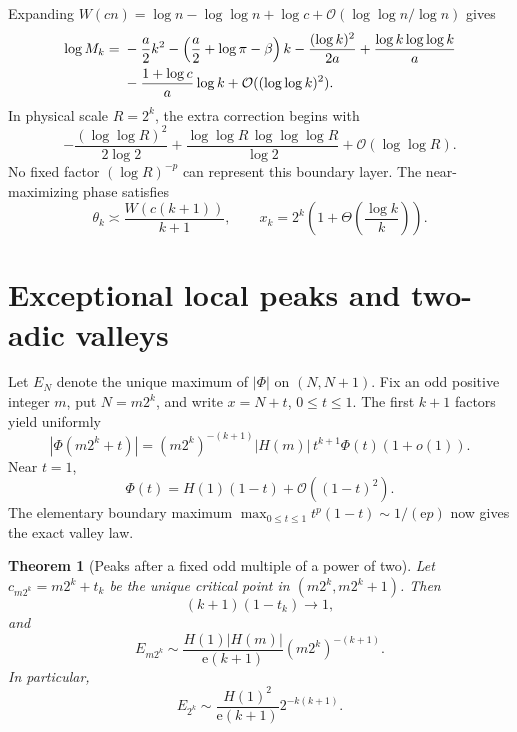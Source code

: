 \documentclass[11pt]{article}
\newtheorem{theorem}{Theorem}[section]
\theoremstyle{definition}
\theoremstyle{remark}
\newcommand{\e}{\mathrm e}
\newcommand{\bigO}{\mathcal O}
\begin{document}
Expanding \(W(cn)=\log n-\log\log n+\log c+\bigO(\log\log n/\log n)\)
gives
\begin{align}
 \log M_k={}&-\frac a2k^2
 -\left(\frac a2+\log\pi-\beta\right)k
 -\frac{(\log k)^2}{2a}
 +\frac{\log k\log\log k}{a}\notag\\
 &-\frac{1+\log c}{a}\log k
 +\bigO((\log\log k)^2).
 \label{eq:annulus-expanded}
\end{align}
In physical scale \(R=2^k\), the extra correction begins with
\begin{equation}
 -\frac{(\log\log R)^2}{2\log2}
 +\frac{\log\log R\,\log\log\log R}{\log2}
 +\bigO(\log\log R).
 \label{eq:second-lognormal}
\end{equation}
No fixed factor \((\log R)^{-p}\) can represent this boundary layer.  The
near-maximizing phase satisfies
\begin{equation}
 \theta_k\asymp\frac{W(c(k+1))}{k+1},
 \qquad
 x_k=2^k\left(1+\Theta\!\left(\frac{\log k}{k}\right)\right).
 \label{eq:max-location}
\end{equation}

\section{Exceptional local peaks and two-adic valleys}
\label{sec:valleys}

Let \(E_N\) denote the unique maximum of \(|\Phi|\) on \((N,N+1)\).
Fix an odd positive integer \(m\), put \(N=m2^k\), and write
\(x=N+t\), \(0\le t\le1\).  The first \(k+1\) factors yield uniformly
\begin{equation}
 |\Phi(m2^k+t)|
 =(m2^k)^{-(k+1)}|H(m)|\,t^{k+1}\Phi(t)(1+o(1)).
 \label{eq:near-m2k}
\end{equation}
Near \(t=1\),
\begin{equation}
 \Phi(t)=H(1)(1-t)+\bigO((1-t)^2).
 \label{eq:Phi-near-one}
\end{equation}
The elementary boundary maximum
\(\max_{0\le t\le1}t^p(1-t)\sim1/(\e p)\) now gives the exact valley law.

\begin{theorem}[Peaks after a fixed odd multiple of a power of two]
\label{thm:twoadic}
Let \(c_{m2^k}=m2^k+t_k\) be the unique critical point in
\((m2^k,m2^k+1)\).  Then
\begin{equation}
 (k+1)(1-t_k)\longrightarrow1,
 \label{eq:twoadic-location}
\end{equation}
and
\begin{equation}
 \boxed{
 E_{m2^k}\sim
 \frac{H(1)|H(m)|}{\e(k+1)}(m2^k)^{-(k+1)}.}
 \label{eq:twoadic-peak}
\end{equation}
In particular,
\begin{equation}
 E_{2^k}\sim\frac{H(1)^2}{\e(k+1)}2^{-k(k+1)}.
 \label{eq:power-two-peak}
\end{equation}
\end{theorem}
\end{document}
